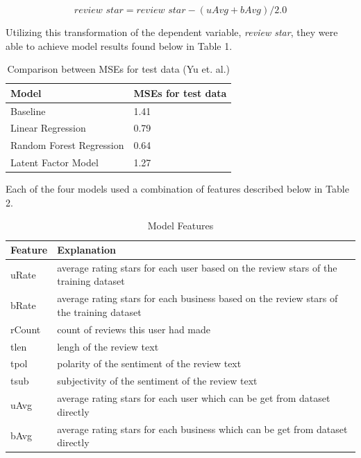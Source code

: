 \documentclass[12pt]{article}
\begin{document}
\[
\textit{review star} = \textit{review star} - (uAvg + bAvg)/2.0
\]

Utilizing this transformation of the dependent variable, \textit{review star}, they were
able to achieve model results found below in Table 1.

\begin{table}[h]
  \caption{\label{tab:rep-models}Comparison between MSEs for test data (Yu et. al.)}
  \begin{tabular}{|l|l|}
    \hline
    \textbf{Model} & \textbf{MSEs for test data} \\
    \hline
    Baseline & 1.41 \\
    \hline
    Linear Regression & 0.79 \\
    \hline
    Random Forest Regression & 0.64 \\
    \hline
    Latent Factor Model & 1.27 \\
    \hline
  \end{tabular}
\end{table}

Each of the four models used a combination of features described below in Table 2.

\begin{table}[h]
  \caption{\label{tab:features}Model Features}
\begin{tabular}{| l | l |}
  \hline
  \textbf{Feature} & \textbf{Explanation} \\
  \hline
  uRate & average rating stars for each user based on the review stars of the
          training dataset \\
  \hline
  bRate & average rating stars for each business based on the review stars of the training 
          dataset \\
  \hline
  rCount & count of reviews this user had made \\
  \hline
  tlen & lengh of the review text \\
  \hline
  tpol & polarity of the sentiment of the review text \\
  \hline
  tsub & subjectivity of the sentiment of the review text \\
  \hline
  uAvg & average rating stars for each user which can be get from dataset directly \\
  \hline
  bAvg & average rating stars for each business which can be get from dataset directly \\
  \hline
\end{tabular}
\end{table}
\end{document}

